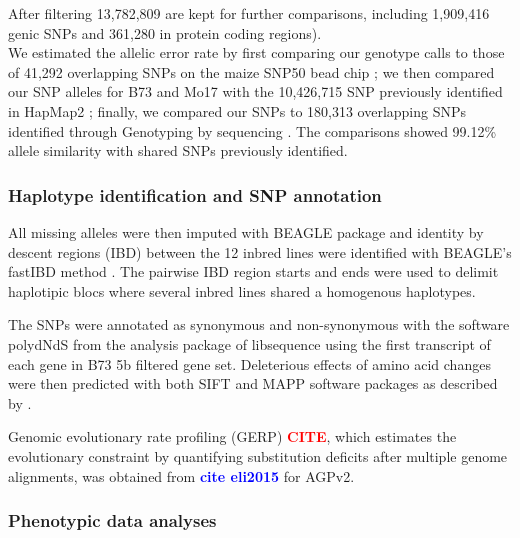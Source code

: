 \documentclass[10pt]{article}
\newcommand{\sme}[1]{\textcolor{red}{\bf #1}}
\newcommand{\yang}[1]{\textcolor{blue}{\bf #1}}
\begin{document}
After filtering 13,782,809 are kept for further comparisons, including 1,909,416 genic SNPs and 361,280 in protein coding regions). \\
We estimated the allelic error rate by first comparing our genotype calls to those of 41,292 overlapping SNPs on the maize SNP50 bead chip \citep{Heerwaarden2012};  we then compared our SNP alleles for B73 and Mo17 with the 10,426,715 SNP previously identified in HapMap2 \citep{Chia2012}; finally, we compared our SNPs to 180,313 overlapping SNPs identified through Genotyping by sequencing \citep{Romay2013}. The comparisons showed 99.12\% allele similarity with shared SNPs previously identified. 


\subsubsection*{Haplotype identification and SNP annotation}

All missing alleles were then imputed with BEAGLE package \citep{Browning2009} and identity by descent regions (IBD) between the 12 inbred lines were identified with BEAGLE's fastIBD method \citep{Browning2011}. The pairwise IBD region starts and ends were used to delimit haplotipic blocs where several inbred lines shared a homogenous haplotypes.%

The SNPs were annotated as synonymous and non-synonymous with the software polydNdS from the analysis package of libsequence  \citep{Thornton2003} using the first transcript of each gene in B73 5b filtered gene set. Deleterious effects of amino acid changes were then predicted with both SIFT \citep{Ng2003, Ng2006} and MAPP \citep{Stone2005} software packages as described by \citep{Mezmouk2014}.

Genomic evolutionary rate profiling (GERP) \sme{CITE}, which estimates the evolutionary constraint by quantifying substitution deficits after multiple genome alignments, was obtained from \yang{cite eli2015} for AGPv2. 



\subsubsection*{Phenotypic data analyses}
\end{document}
